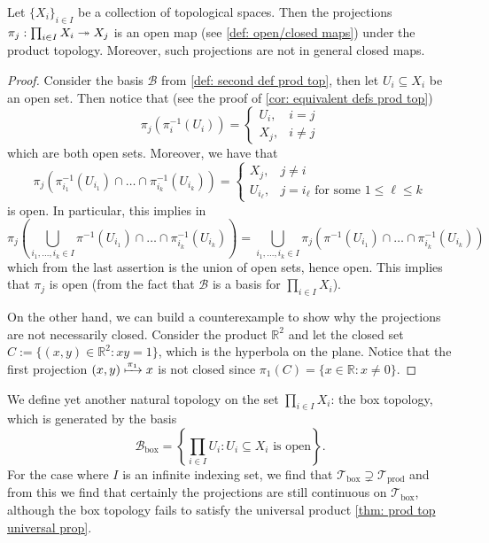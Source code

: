 \begin{lemma}
  Let \(\{X_i\}_{i \in I} \) be a collection of topological spaces. Then the
  projections \(\pi_j: \prod_{i \in I} X_i \twoheadrightarrow X_j\) is an open map (see
  \cref{def: open/closed maps}) under the product topology. Moreover, such
  projections are not in general closed maps.
\end{lemma}

\begin{proof}
  Consider the basis \(\mathcal B\) from \cref{def: second def prod top}, then
  let \(U_i \subseteq X_i\) be an open set. Then notice that (see the proof of
  \cref{cor: equivalent defs prod top})
  \[
    \pi_j(\pi_i^{-1}(U_i)) =
    \begin{cases}
      U_i, &i = j \\
      X_j, &i \neq j
    \end{cases}
  \]
  which are both open sets. Moreover, we have that
  \[
    \pi_j \left(\pi_{i_1}^{-1}(U_{i_1}) \cap \dots \cap \pi_{i_k}^{-1}(U_{i_k})
    \right) =
    \begin{cases}
      X_j,        & j \neq i \\
      U_{i_\ell}, & j = i_\ell \text{ for some } 1 \leq \ell \leq k
    \end{cases}
  \]
  is open. In particular, this implies in
  \[
    \pi_j \left( \bigcup_{i_1, \dots, i_k \in I} \pi^{-1}(U_{i_1}) \cap \dots
    \cap \pi_{i_k}^{-1}(U_{i_k}) \right)
    =
    \bigcup_{i_1, \dots, i_k \in I} \pi_j \left( \pi^{-1}(U_{i_1}) \cap \dots
    \cap \pi_{i_k}^{-1}(U_{i_k}) \right)
  \]
  which from the last assertion is the union of open sets, hence open. This
  implies that \(\pi_j\) is open (from the fact that \(\mathcal B\) is a basis
  for \(\prod_{i \in I} X_i\)).

  On the other hand, we can build a counterexample to show why the projections
  are not necessarily closed. Consider the product \(\mathbb{R}^2\) and let the
  closed set \(C := \{(x, y) \in \mathbb{R}^2 : x y = 1\}\), which is the
  hyperbola on the plane. Notice that the first projection \((x, y)
  \xmapsto{\pi_1} x\) is not closed since \(\pi_1(C) = \{x \in \mathbb{R} : x
  \neq 0\}\).
\end{proof}

\begin{definition}
  We define yet another natural topology on the set \(\prod_{i \in I} X_i\): the
  box topology, which is generated by the basis
  \[
    \mathcal B_\text{box} = \left\{\prod_{i \in I} U_i : U_i \subseteq X_i
    \text{ is open}\right\}.
  \]
  For the case where \(I\) is an infinite indexing set, we find that \(\mathcal
  T_\text{box} \supsetneq \mathcal T_\text{prod}\) and from this we find that
  certainly the projections are still continuous on \(\mathcal T_\text{box}\),
  although the box topology fails to satisfy the universal product \cref{thm:
  prod top universal prop}.
\end{definition}

